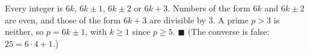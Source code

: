 Every integer is $6k$, $6k\pm1$, $6k\pm2$ or $6k+3$. Numbers of the form $6k$ and $6k\pm2$ are even, and those of the form $6k+3$ are divisible by $3$. A prime $p>3$ is neither, so $p=6k\pm1$, with $k\ge1$ since $p\ge5$. $\blacksquare$ (The converse is false: $25=6\cdot4+1$.)
